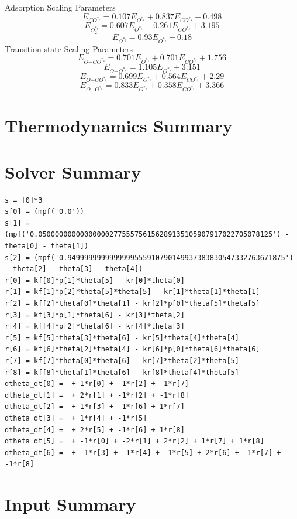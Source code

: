 \documentclass[a4paper,8pt]{report}
\begin{document}
Adsorption Scaling Parameters\\
\begin{equation}
\label{ads_scaling_1}
E_{CO^{*_t}} = 0.107E_{O^{*_s}} + 0.837E_{CO^{*_s}} + 0.498
\end{equation}
\begin{equation}
\label{ads_scaling_2}
E_{O_{2}^{*_t}} = 0.607E_{O^{*_s}} + 0.261E_{CO^{*_s}} + 3.195
\end{equation}
\begin{equation}
\label{ads_scaling_3}
E_{O^{*_t}} = 0.93E_{O^{*_s}} + 0.18
\end{equation}
Transition-state Scaling Parameters\\
\begin{equation}
\label{TS_scaling_1}
E_{O\mathrm{-}CO^{*_s}} = 0.701E_{O^{*_s}} + 0.701E_{CO^{*_s}} + 1.756
\end{equation}
\begin{equation}
\label{TS_scaling_2}
E_{O\mathrm{-}O^{*_s}} = 1.105E_{O^{*_s}} + 3.151
\end{equation}
\begin{equation}
\label{TS_scaling_3}
E_{O\mathrm{-}CO^{*_t}} = 0.699E_{O^{*_s}} + 0.564E_{CO^{*_s}} + 2.29
\end{equation}
\begin{equation}
\label{TS_scaling_4}
E_{O\mathrm{-}O^{*_t}} = 0.833E_{O^{*_s}} + 0.358E_{CO^{*_s}} + 3.366
\end{equation}\section{Thermodynamics Summary}
\section{Solver Summary}
\begin{verbatim}s = [0]*3
s[0] = (mpf('0.0'))
s[1] = (mpf('0.05000000000000000277555756156289135105907917022705078125') - theta[0] - theta[1])
s[2] = (mpf('0.9499999999999999555910790149937383830547332763671875') - theta[2] - theta[3] - theta[4])
r[0] = kf[0]*p[1]*theta[5] - kr[0]*theta[0]
r[1] = kf[1]*p[2]*theta[5]*theta[5] - kr[1]*theta[1]*theta[1]
r[2] = kf[2]*theta[0]*theta[1] - kr[2]*p[0]*theta[5]*theta[5]
r[3] = kf[3]*p[1]*theta[6] - kr[3]*theta[2]
r[4] = kf[4]*p[2]*theta[6] - kr[4]*theta[3]
r[5] = kf[5]*theta[3]*theta[6] - kr[5]*theta[4]*theta[4]
r[6] = kf[6]*theta[2]*theta[4] - kr[6]*p[0]*theta[6]*theta[6]
r[7] = kf[7]*theta[0]*theta[6] - kr[7]*theta[2]*theta[5]
r[8] = kf[8]*theta[1]*theta[6] - kr[8]*theta[4]*theta[5]
dtheta_dt[0] =  + 1*r[0] + -1*r[2] + -1*r[7]
dtheta_dt[1] =  + 2*r[1] + -1*r[2] + -1*r[8]
dtheta_dt[2] =  + 1*r[3] + -1*r[6] + 1*r[7]
dtheta_dt[3] =  + 1*r[4] + -1*r[5]
dtheta_dt[4] =  + 2*r[5] + -1*r[6] + 1*r[8]
dtheta_dt[5] =  + -1*r[0] + -2*r[1] + 2*r[2] + 1*r[7] + 1*r[8]
dtheta_dt[6] =  + -1*r[3] + -1*r[4] + -1*r[5] + 2*r[6] + -1*r[7] + -1*r[8]
\end{verbatim}\section{Input Summary}
\end{document}
